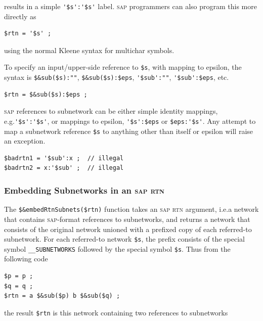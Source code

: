 \documentclass[letterpaper,12pt]{article}
\newcommand{\acro}{\textsc}
\begin{document}
\noindent
results in a simple \verb!'$s':'$s'! label.  \acro{sap} programmers can
also program this more directly as

\begin{Verbatim}[fontsize=\small]
$rtn = '$s' ;
\end{Verbatim}

\noindent
using the normal Kleene syntax for multichar symbols.


To specify an input/upper-side reference to \verb!$s!, with mapping to
epsilon, the syntax is \verb!$&sub($s):""!, \verb!$&sub($s):$eps!,
\verb!'$sub':""!, \verb!'$sub':$eps!, etc.

\begin{Verbatim}[fontsize=\small]
$rtn = $&sub($s):$eps ;
\end{Verbatim}

\acro{sap} references to subnetwork can be either simple identity
mappings, e.g.\@ \verb!'$s':'$s'!, or mappings to epsilon,
\verb!'$s':$eps! or \verb!$eps:'$s'!.  Any attempt to map a subnetwork
reference \verb!$s! to anything other than itself or epsilon will raise
an exception.

\begin{Verbatim}[fontsize=\small]
$badrtn1 = '$sub':x ;  // illegal
$badrtn2 = x:'$sub' ;  // illegal
\end{Verbatim}

\subsubsection{Embedding Subnetworks in an \acro{sap} \acro{rtn}}

The \verb!$&embedRtnSubnets($rtn)! function takes an \acro{sap}
\acro{rtn} argument, i.e.\@ a network that contains \acro{sap}-format
references to subnetworks, and returns a network that consists of the
original network unioned with a prefixed copy of each referred-to
subnetwork.  For each referred-to network \verb!$s!, the prefix consists
of the special symbol \verb!__SUBNETWORKS! followed by the special symbol
\verb!$s!.  Thus from the following code

\begin{Verbatim}[fontsize=\small]
$p = p ;
$q = q ;
$rtn = a $&sub($p) b $&sub($q) ;
\end{Verbatim}

\noindent
the result \verb!$rtn! is this network containing two references to subnetworks
\end{document}
